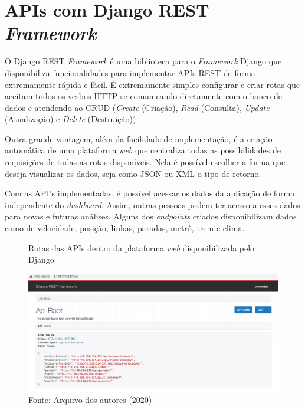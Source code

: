 \section{APIs com Django REST \textit{Framework}}
\indent
\par O Django REST \textit{Framework} é uma biblioteca para o \textit{Framework} Django que disponibiliza funcionalidades para implementar APIs REST de forma extremamente rápida e fácil. É extremamente simples configurar e criar rotas que aceitam todos os verbos HTTP se comunicando diretamente com o banco de dados e atendendo ao CRUD (\textit{Create} (Criação), \textit{Read} (Consulta), \textit{Update} (Atualização) e \textit{Delete} (Destruição)).
\indent
\par Outra grande vantagem, além da facilidade de implementação, é a criação automática de uma plataforma \textit{web} que centraliza todas as possibilidades de requisições de todas as rotas disponíveis. Nela é possível escolher a forma que deseja visualizar os dados, seja como JSON ou XML o tipo de retorno.
\indent
\par Com as API’s implementadas, é possível acessar os dados da aplicação de forma independente do \textit{dashboard}. Assim, outras pessoas podem ter acesso a esses dados para novas e futuras análises. Alguns dos \textit{endpoints} criados disponibilizam dados como de velocidade, posição, linhas, paradas, metrô, trem e clima.

\begin{figure}[H]
    \centering
    \caption{Rotas das APIs dentro da plataforma \textit{web} disponibilizada pelo Django}
    \includegraphics[width=1.0\linewidth]{Imagens/rotasDisponiveis.png}
    \caption*{Fonte: Arquivo dos autores (2020)}
    \label{rotasDisponiveis}
\end{figure}

